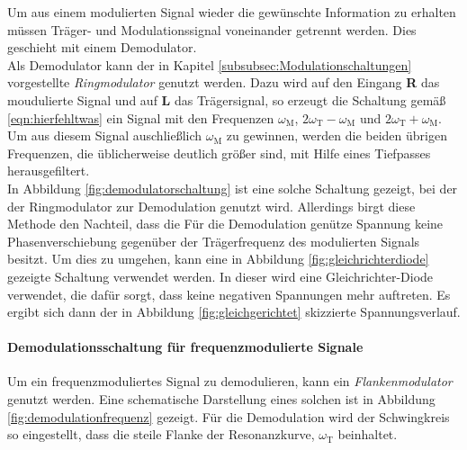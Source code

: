 Um aus einem modulierten Signal wieder die gewünschte Information zu erhalten
müssen Träger- und Modulationssignal voneinander getrennt werden.
Dies geschieht mit einem Demodulator.\\
Als Demodulator kann der in Kapitel \ref{subsubsec:Modulationschaltungen}
vorgestellte \textit{Ringmodulator} genutzt werden.
Dazu wird auf den Eingang \textbf{R} das moudulierte Signal und
auf \textbf{L} das Trägersignal, so erzeugt die Schaltung
gemäß \eqref{eqn:hierfehltwas} ein Signal mit den Frequenzen
$\omega_{\text{M}}$, $2\omega_{\text{T}} - \omega_{\text{M}}$
und $2\omega_{\text{T}} + \omega_{\text{M}}$.
Um aus diesem Signal auschließlich $\omega_{\text{M}}$ zu gewinnen,
werden die beiden übrigen Frequenzen, die üblicherweise deutlich größer sind,
mit Hilfe eines Tiefpasses herausgefiltert.\\
In Abbildung \ref{fig:demodulatorschaltung} ist eine solche Schaltung gezeigt,
bei der der Ringmodulator zur Demodulation genutzt wird. Allerdings
birgt diese Methode den Nachteil, dass die Für die Demodulation genütze
Spannung keine Phasenverschiebung gegenüber der Trägerfrequenz des
modulierten Signals besitzt.
Um dies zu umgehen, kann eine in Abbildung \ref{fig:gleichrichterdiode} gezeigte
Schaltung verwendet werden. In dieser wird eine Gleichrichter-Diode verwendet,
die dafür sorgt, dass keine negativen Spannungen mehr auftreten.
Es ergibt sich dann der in Abbildung \ref{fig:gleichgerichtet}
skizzierte Spannungsverlauf.

\paragraph{Demodulationsschaltung für frequenzmodulierte Signale}
Um ein frequenzmoduliertes Signal zu demodulieren, kann ein
\textit{Flankenmodulator} genutzt werden.
Eine schematische Darstellung eines solchen ist in Abbildung \ref{fig:demodulationfrequenz}
gezeigt. Für die Demodulation wird der Schwingkreis so eingestellt, dass
die steile Flanke der Resonanzkurve, $\omega_{\text{T}}$ beinhaltet.
